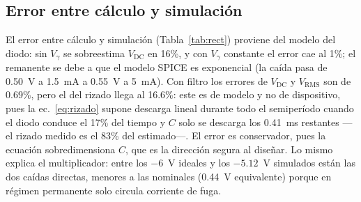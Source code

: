 \documentclass[conference,10pt]{IEEEtran}
\newcommand{\VDC}{V_{\mathrm{DC}}}
\newcommand{\VRMS}{V_{\mathrm{RMS}}}
\newcommand{\Vg}{V_\gamma}
\begin{document}
\subsection{Error entre cálculo y simulación}
El error entre cálculo y simulación (Tabla~\ref{tab:rect}) proviene del
modelo del diodo: sin $\Vg$ se sobreestima $\VDC$ en 16\%, y con $\Vg$
constante el error cae al 1\%; el remanente se debe a que el modelo
SPICE es exponencial (la caída pasa de 0.50~V a 1.5~mA a 0.55~V a
5~mA). Con filtro los errores de $\VDC$ y $\VRMS$ son de 0.69\%, pero
el del rizado llega al 16.6\%: este es de modelo y no de dispositivo,
pues la ec.~\eqref{eq:rizado} supone descarga lineal durante todo el
semiperíodo cuando el diodo conduce el 17\% del tiempo y $C$ solo se
descarga los 0.41~ms restantes ---el rizado medido es el 83\% del
estimado---. El error es conservador, pues la ecuación sobredimensiona
$C$, que es la dirección segura al diseñar. Lo mismo explica el
multiplicador: entre los $-6$~V ideales y los $-5.12$~V simulados están
las dos caídas directas, menores a las nominales (0.44~V equivalente)
porque en régimen permanente solo circula corriente de fuga.

\end{document}

